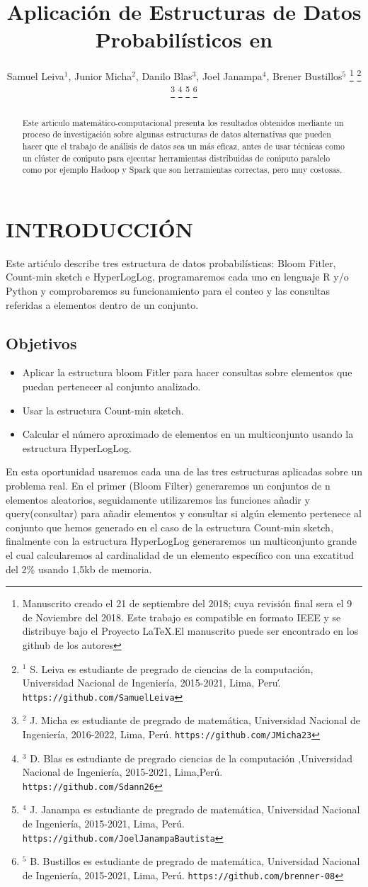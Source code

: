 \documentclass[journal]{IEEEtran}
\title{\LARGE \bf Aplicaci\'on de Estructuras de Datos Probabil\'isticos en
}
\author{Samuel Leiva$^{1}$, Junior Micha$^{2}$, Danilo Blas$^{3}$, Joel Janampa$^{4}$, Brener Bustillos$^{5}$%
\thanks{Manuscrito creado el 21 de septiembre del 2018; cuya revisi\'on final sera el 9 de Noviembre del 2018. Este trabajo es compatible en formato IEEE y se distribuye bajo el Proyecto LaTeX.El manuscrito puede ser encontrado en los github de los autores}%
\thanks{$^{1}$ S. Leiva es estudiante de pregrado de ciencias de la computaci\'on, Universidad Nacional de Ingenier\'ia, 2015-2021, Lima, Peru\'.
        {\tt\small https://github.com/SamuelLeiva}}%
\thanks{$^{2}$ J. Micha es estudiante de pregrado de matem\'atica, Universidad Nacional de Ingenier\'ia, 2016-2022, Lima, Per\'u.
        {\tt\small https://github.com/JMicha23}}%
\thanks{$^{3}$ D. Blas es estudiante de pregrado ciencias de la computaci\'on ,Universidad Nacional de Ingenier\'ia, 2015-2021, Lima,Per\'u.
        {\tt\small https://github.com/Sdann26}}%
\thanks{$^{4}$ J. Janampa es estudiante de pregrado de matem\'atica, Universidad Nacional de Ingenier\'ia, 2015-2021, Lima, Per\'u.
        {\tt\small https://github.com/JoelJanampaBautista}}%
\thanks{$^{5}$ B. Bustillos es estudiante de pregrado de matem\'atica, Universidad Nacional de Ingenier\'ia, 2015-2021, Lima, Per\'u. 
        {\tt\small https://github.com/brenner-08}}%
}
\begin{document}
\maketitle
\thispagestyle{empty}
\pagestyle{empty}


\begin{abstract}
    

Este articulo matem\'atico-computacional presenta los resultados obtenidos mediante un proceso de investigaci\'on sobre algunas estructuras de datos alternativas que pueden hacer que el trabajo de an\'alisis de datos sea un m\'as eficaz, antes de usar t\'ecnicas como un cl\'uster de co\'mputo para ejecutar herramientas distribuidas de co\'mputo paralelo como por ejemplo  Hadoop y Spark que son herramientas correctas, pero muy costosas.

\end{abstract}


\section{INTRODUCCI\'ON}

Este arti\'culo describe tres estructura de datos probabilísticas: Bloom Fitler, Count-min sketch e HyperLogLog, programaremos cada uno en lenguaje R y/o Python y comprobaremos su funcionamiento para el conteo y las consultas referidas a elementos dentro de un conjunto.

\subsection{Objetivos}
\begin{itemize}
    \item Aplicar la estructura bloom Fitler para hacer consultas sobre elementos que puedan pertenecer al conjunto analizado. 
    \item Usar la estructura Count-min sketch.
    \item Calcular el número aproximado de elementos en un multiconjunto usando la estructura HyperLogLog. 
\end{itemize}

En esta oportunidad usaremos cada una de las tres estructuras aplicadas sobre un problema real. En el primer (Bloom Filter) generaremos un conjuntos de n elementos aleatorios, seguidamente utilizaremos las funciones añadir y query(consultar) para añadir elementos y consultar si algún elemento pertenece al conjunto que hemos generado en el caso de la estructura Count-min sketch, finalmente con la estructura HyperLogLog generaremos un multiconjunto grande el cual calcularemos al cardinalidad de un elemento específico con una excatitud del 2\% usando 1,5kb de memoria.
\end{document}
